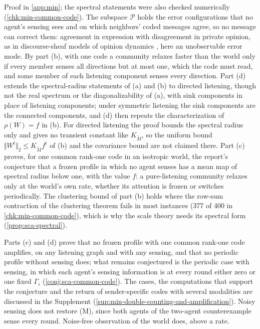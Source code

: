 Proof in \cref{app:min}; the spectral statements were also checked numerically (\cref{chk:min-common-code}). The subspace $\mathcal P$ holds the error configurations that no agent's sensing sees and on which neighbors' coded messages agree, so no message can correct them: agreement in expression with disagreement in private opinion, as in discourse-sheaf models of opinion dynamics \citep{hansen2021opinion}, here an unobservable error mode. By part (b), with one code a community relaxes faster than the world only if every member senses all directions but at most one, which the code must read, and some member of each listening component senses every direction. Part (d) extends the spectral-radius statements of (a) and (b) to directed listening, though not the real spectrum or the diagonalizability of (a), with sink components in place of listening components; under symmetric listening the sink components are the connected components, and (d) then repeats the characterization of $\rho(W)=f$ in (b). For directed listening the proof bounds the spectral radius only and gives no transient constant like $K_{\tilde M}$, so the uniform bound $\Vert W^t\Vert_2\le K_{\tilde M}f^t$ of (b) and the covariance bound are not claimed there. Part (c) proves, for one common rank-one code in an isotropic world, the report's conjecture that a frozen profile in which no agent senses has a mean map of spectral radius below one, with the value $f$: a pure-listening community relaxes only at the world's own rate, whether its attention is frozen or switches periodically. The clustering bound of part (b) holds where the row-sum contraction of the clustering theorem fails in most instances (377 of 400 in \cref{chk:min-common-code}), which is why the scale theory needs its spectral form (\cref{prop:sca-spectral}).

Parts (c) and (d) prove that no frozen profile with one common rank-one code amplifies, on any listening graph and with any sensing, and that no periodic profile without sensing does; what remains conjectured is the periodic case with sensing, in which each agent's sensing information is at every round either zero or one fixed $\Gamma_i$ (\cref{conj:sca-common-code}). The cases, the computations that support the conjecture and the return of sender-specific codes with several modalities are discussed in the Supplement (\cref{sup:min-double-counting-and-amplification}). Noisy sensing does not restore (M), since both agents of the two-agent counterexample sense every round. Noise-free observation of the world does, above a rate.

